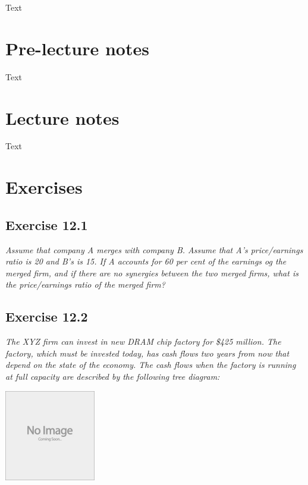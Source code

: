 \documentclass[]{book}
\theoremstyle{definition}
\theoremstyle{definition}
\theoremstyle{remark}
\begin{document}
Text

\section{Pre-lecture notes}\label{pre-lecture-notes-11}

Text

\section{Lecture notes}\label{lecture-notes-11}

Text

\section{Exercises}\label{exercises-11}

\subsection{Exercise 12.1}\label{exercise-12.1}

\emph{Assume that company A merges with company B. Assume that A's
price/earnings ratio is 20 and B's is 15. If A accounts for 60 per cent
of the earnings og the merged firm, and if there are no synergies
between the two merged firms, what is the price/earnings ratio of the
merged firm?} \citep[p.424]{book}

\subsection{Exercise 12.2}\label{exercise-12.2}

\emph{The XYZ firm can invest in new DRAM chip factory for \$425
million. The factory, which must be invested today, has cash flows two
years from now that depend on the state of the economy. The cash flows
when the factory is running at full capacity are described by the
following tree diagram:} \citep[p.424]{book}

\begin{center}\includegraphics[width=150px]{figures/placeholder} \end{center}
\end{document}
